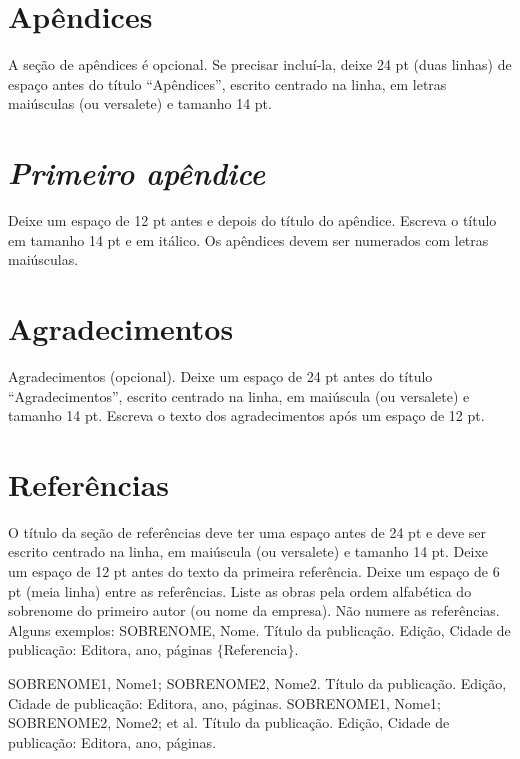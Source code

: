 \documentclass[
	article,			%
	12pt,				%
	oneside,			%
	a4paper,			%
	english,			%
	brazil,				%
	sumario=tradicional
	]{abntex2}
\begin{document}
\appendix
\section*{Apêndices}
 
A seção de apêndices é opcional.  Se precisar incluí-la, deixe 24 pt (duas linhas) de espaço antes do título “Apêndices”,  escrito centrado na linha, em letras maiúsculas (ou versalete) e tamanho 14 pt.
 
\renewcommand{\thesection}{\textit{\Alph{section}} }
\section{\textit{Primeiro apêndice}}
 
Deixe um espaço de 12 pt antes e depois do título do apêndice.  Escreva o título em tamanho 14 pt e em itálico.  Os apêndices devem ser numerados com letras maiúsculas.


\section*{Agradecimentos}

Agradecimentos (opcional).  Deixe um espaço de 24 pt antes do título “Agradecimentos”, escrito centrado na linha, em maiúscula (ou versalete) e tamanho 14 pt.  Escreva o texto dos agradecimentos após um espaço de 12 pt.

\section*{Referências}

O título da seção de referências deve ter uma espaço antes de 24 pt e deve ser escrito centrado na linha, em maiúscula (ou versalete) e tamanho 14 pt.  Deixe um espaço de 12 pt antes do texto da primeira referência.  Deixe um espaço de 6 pt (meia linha) entre as referências.
Liste as obras pela ordem alfabética do sobrenome do primeiro autor (ou nome da empresa).  Não numere as referências.  Alguns exemplos:
SOBRENOME, Nome. Título da publicação.  Edição, Cidade de publicação: Editora, ano, páginas $\{ $Referencia$\} $.

SOBRENOME1, Nome1;  SOBRENOME2, Nome2.  Título da publicação.  Edição, Cidade de publicação: Editora, ano, páginas.
SOBRENOME1, Nome1;  SOBRENOME2, Nome2; et al.  Título da publicação.  Edição, Cidade de publicação: Editora, ano, páginas.
\end{document}
